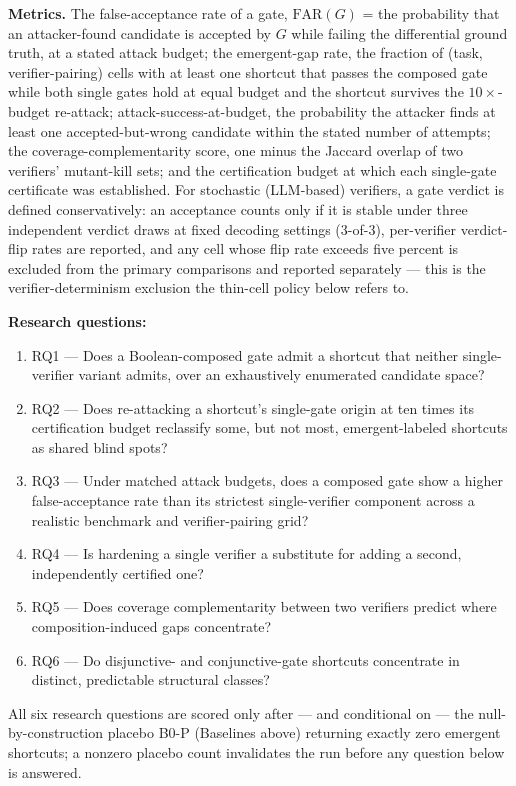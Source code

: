 \documentclass[11pt]{article}
\begin{document}
\textbf{Metrics.} The false-acceptance rate of a gate, $\mathrm{FAR}(G)$ = the probability that an attacker-found candidate is accepted by $G$ while failing the differential ground truth, at a stated attack budget; the emergent-gap rate, the fraction of (task, verifier-pairing) cells with at least one shortcut that passes the composed gate while both single gates hold at equal budget and the shortcut survives the $10\times$-budget re-attack; attack-success-at-budget, the probability the attacker finds at least one accepted-but-wrong candidate within the stated number of attempts; the coverage-complementarity score, one minus the Jaccard overlap of two verifiers' mutant-kill sets; and the certification budget at which each single-gate certificate was established. For stochastic (LLM-based) verifiers, a gate verdict is defined conservatively: an acceptance counts only if it is stable under three independent verdict draws at fixed decoding settings (3-of-3), per-verifier verdict-flip rates are reported, and any cell whose flip rate exceeds five percent is excluded from the primary comparisons and reported separately --- this is the verifier-determinism exclusion the thin-cell policy below refers to.

\textbf{Research questions:}
\begin{enumerate}[leftmargin=1.6em]
\item RQ1 --- Does a Boolean-composed gate admit a shortcut that neither single-verifier variant admits, over an exhaustively enumerated candidate space?
\item RQ2 --- Does re-attacking a shortcut's single-gate origin at ten times its certification budget reclassify some, but not most, emergent-labeled shortcuts as shared blind spots?
\item RQ3 --- Under matched attack budgets, does a composed gate show a higher false-acceptance rate than its strictest single-verifier component across a realistic benchmark and verifier-pairing grid?
\item RQ4 --- Is hardening a single verifier a substitute for adding a second, independently certified one?
\item RQ5 --- Does coverage complementarity between two verifiers predict where composition-induced gaps concentrate?
\item RQ6 --- Do disjunctive- and conjunctive-gate shortcuts concentrate in distinct, predictable structural classes?
\end{enumerate}

All six research questions are scored only after --- and conditional on --- the null-by-construction placebo B0-P (Baselines above) returning exactly zero emergent shortcuts; a nonzero placebo count invalidates the run before any question below is answered.
\end{document}

